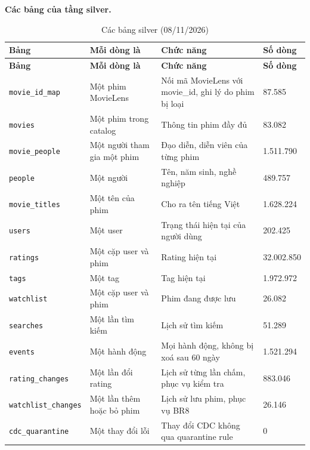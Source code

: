 \documentclass[a4paper,11pt]{article}
\newlength{\reporttablewidth}
\newcommand{\dbsep}{\_\allowbreak}
\begin{document}
\textbf{Các bảng của tầng silver.}

\begingroup
\small
{}
\setlength{\tabcolsep}{4pt}
\renewcommand{\arraystretch}{1.18}
\setlength{\reporttablewidth}{\dimexpr\linewidth-6\tabcolsep\relax}
\begin{longtable}{@{}L{0.29\reporttablewidth} L{0.23\reporttablewidth} L{0.32\reporttablewidth} L{0.16\reporttablewidth}@{}}
\caption[Các bảng silver (Phụ lục E)]{Các bảng silver (08/11/2026)}\label{tab:27} \\
\toprule
\textbf{Bảng} & \textbf{Mỗi dòng là} & \textbf{Chức năng} & \textbf{Số dòng} \\
\midrule
\endfirsthead
\toprule
\textbf{Bảng} & \textbf{Mỗi dòng là} & \textbf{Chức năng} & \textbf{Số dòng} \\
\midrule
\endhead
\midrule
\endfoot
\bottomrule
\endlastfoot
\texttt{movie\dbsep{}id\dbsep{}map} & Một phim MovieLens & Nối mã MovieLens với movie\_id, ghi lý do phim bị loại & 87.585 \\
\texttt{movies} & Một phim trong catalog & Thông tin phim đầy đủ & 83.082 \\
\texttt{movie\dbsep{}people} & Một người tham gia một phim & Đạo diễn, diễn viên của từng phim & 1.511.790 \\
\texttt{people} & Một người & Tên, năm sinh, nghề nghiệp & 489.757 \\
\texttt{movie\dbsep{}titles} & Một tên của phim & Cho ra tên tiếng Việt & 1.628.224 \\
\texttt{users} & Một user & Trạng thái hiện tại của người dùng & 202.425 \\
\texttt{ratings} & Một cặp user và phim & Rating hiện tại & 32.002.850 \\
\texttt{tags} & Một tag & Tag hiện tại & 1.972.972 \\
\texttt{watchlist} & Một cặp user và phim & Phim đang được lưu & 26.082 \\
\texttt{searches} & Một lần tìm kiếm & Lịch sử tìm kiếm & 51.289 \\
\texttt{events} & Một hành động & Mọi hành động, không bị xoá sau 60 ngày & 1.521.294 \\
\texttt{rating\dbsep{}changes} & Một lần đổi rating & Lịch sử từng lần chấm, phục vụ kiểm tra & 883.046 \\
\texttt{watchlist\dbsep{}changes} & Một lần thêm hoặc bỏ phim & Lịch sử lưu phim, phục vụ BR8 & 26.146 \\
\texttt{cdc\dbsep{}quarantine} & Một thay đổi lỗi & Thay đổi CDC không qua quarantine rule & 0 \\
\end{longtable}
\endgroup
\end{document}
